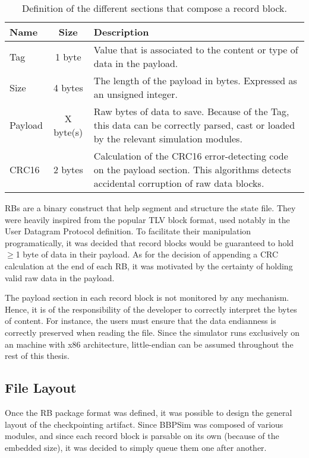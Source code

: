 {\begin{table}[h]
	\vspace{12pt}
	\centering
	\begin{tabularx}{\linewidth}{l c X}
		\toprule
		{\bfseries Name}&{\bfseries Size}&{\bfseries Description}\\
		\midrule
		Tag & 1 byte & Value that is associated to the content or type of data in the payload.\\
		\midrule
		Size & 4 bytes & The length of the payload in bytes. Expressed as an unsigned integer.\\
		\midrule
		Payload & {X byte(s)} & Raw bytes of data to save. Because of the Tag, this data can be correctly parsed, cast or loaded by the relevant simulation modules.\\
		\midrule
		CRC16 & 2 bytes & Calculation of the CRC16 error-detecting code on the payload section. This algorithms detects accidental corruption of raw data blocks.\\
		\bottomrule	
	\end{tabularx}
	\caption{Definition of the different sections that compose a record block.}
	\label{tab:rb-fields}
\end{table}

RBs are a binary construct that help segment and structure the state file. They were heavily inspired from the popular \gls{TLV} block format, used notably in the User Datagram Protocol definition\cite{report:udp}. To facilitate their manipulation programatically, it was decided that record blocks would be guaranteed to hold $\geq$1 byte of data in their payload. As for the decision of appending a \gls{CRC} calculation at the end of each RB, it was motivated by the certainty of holding valid raw data in the payload.

The payload section in each record block is not monitored by any mechanism. Hence, it is of the responsibility of the developer to correctly interpret the bytes of content. For instance, the users must ensure that the data endianness is correctly preserved when reading the file. Since the simulator runs exclusively on an machine with x86 architecture, little-endian can be assumed throughout the rest of this thesis.

\subsection*{File Layout}
Once the RB package format was defined, it was possible to design the general layout of the checkpointing artifact. Since \gls{BBPSim} was composed of various modules, and since each record block is parsable on its own (because of the embedded size), it was decided to simply queue them one after another. 

}
